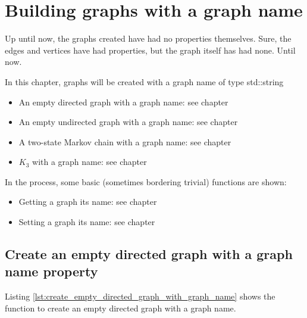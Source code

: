 \chapter{Building graphs with a graph name}
\label{sec:Building-graphs-with-a-graph-name}

Up until now, the graphs created have had no properties themselves.
Sure, the edges and vertices have had properties, but the graph itself
has had none.
Until now.

In this chapter, graphs will be created with a graph name of type std::string

\begin{itemize}
  \item An empty directed graph with a graph name: 
    see chapter 
  \item An empty undirected graph with a graph name: 
    see chapter 
  \item A two-state Markov chain with a graph name: 
    see chapter
  \item $K_{3}$ with a graph name: 
   see chapter 
\end{itemize}

In the process, some basic (sometimes bordering trivial) functions are shown:

\begin{itemize}
  \item Getting a graph its name: 
    see chapter 
  \item Setting a graph its name: 
    see chapter
\end{itemize}

\section{Create an empty directed graph with a graph name property}
\label{subsec:create_empty_directed_graph_with_graph_name}

Listing 
\ref{lst:create_empty_directed_graph_with_graph_name}
shows the function to create an empty directed graph with a graph name.



